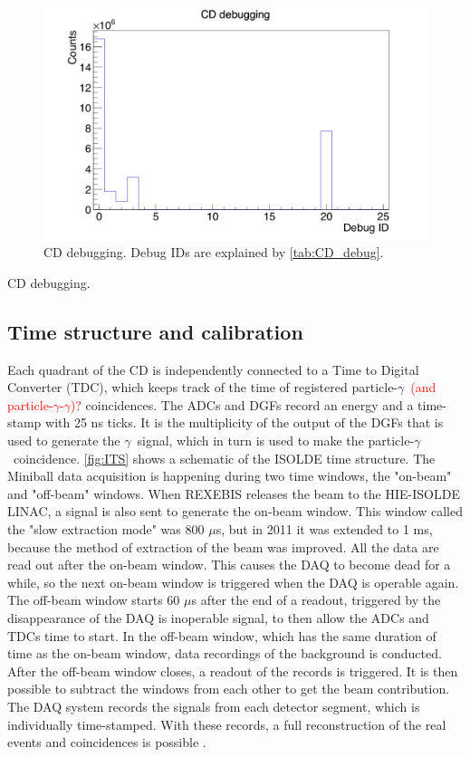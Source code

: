 \documentclass[twoside,english]{uiofysmaster/uiofysmaster}
\newcommand{\ga}{$\gamma$}
\begin{document}
\begin{figure}[ht]
	\centering
	\includegraphics[width=\textwidth]{../Plots/plotting/cd_debug-user.png}
	\caption{CD debugging. Debug IDs are explained by \autoref{tab:CD_debug}. }
	\label{fig:CD_debug}
\end{figure}

\begin{table}[ht] 
	\centering 
	\caption{CD debugging.}
	
	\label{tab:CD_debug}
\end{table}



\subsection{Time structure and calibration}
Each quadrant of the CD is independently connected to a Time to Digital Converter (TDC), which keeps track of the time of registered particle-\ga\ \textcolor{red}{(and particle-\ga-\ga)?} coincidences. 
The ADCs and DGFs record an energy and a time-stamp with 25 ns ticks. 
It is the multiplicity of the output of the DGFs that is used to generate the \ga\ signal, which in turn is used to make the particle-\ga\ coincidence.
\autoref{fig:ITS} shows a schematic of the ISOLDE time structure. 
The Miniball data acquisition is happening during two time windows, the "on-beam" and "off-beam" windows. 
When REXEBIS releases the beam to the HIE-ISOLDE LINAC, a signal is also sent to generate the on-beam window. 
This window called the "slow extraction mode" was 800 $\mu$s, but in 2011 it was extended to 1 ms, because the method of extraction of the beam was improved. 
All the data are read out after the on-beam window. 
This causes the DAQ to become dead for a while, so the next on-beam window is triggered when the DAQ is operable again.
The off-beam window starts 60 $\mu$s after the end of a readout, triggered by the disappearance of the DAQ is inoperable signal, to then allow the ADCs and TDCs time to start. 
In the off-beam window, which has the same duration of time as the on-beam window, data recordings of the background is conducted.
After the off-beam window closes, a readout of the records is triggered.
It is then possible to subtract the windows from each other to get the beam contribution. 
The DAQ system records the signals from each detector segment, which is individually time-stamped. 
With these records, a full reconstruction of the real events and coincidences is possible \cite{NWarr-el}.
\end{document}
